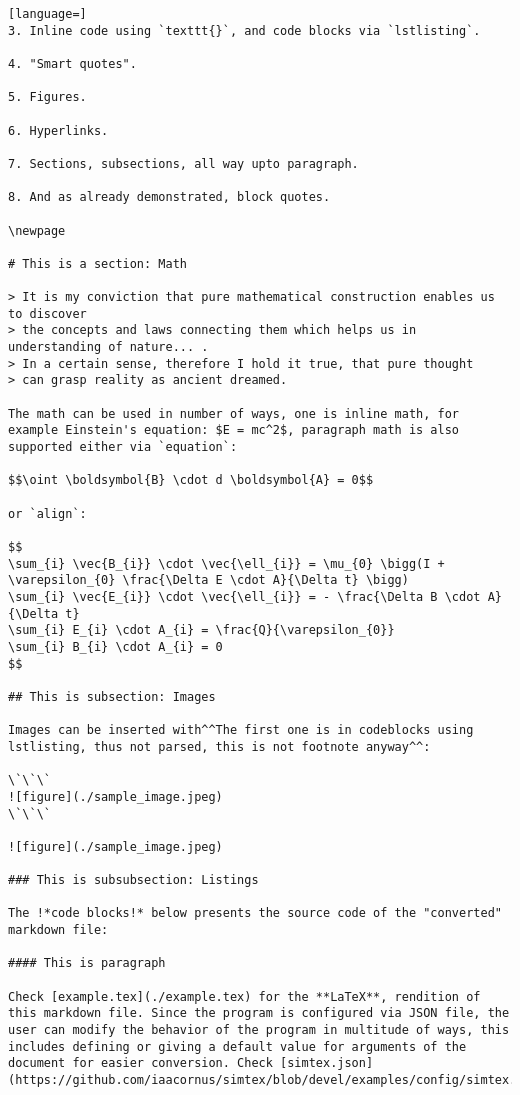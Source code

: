 \documentclass[12pt, UTF8]{article}
\begin{document}
\begin{lstlisting}[language=]
3. Inline code using `texttt{}`, and code blocks via `lstlisting`.

4. "Smart quotes".

5. Figures.

6. Hyperlinks.

7. Sections, subsections, all way upto paragraph.

8. And as already demonstrated, block quotes.

\newpage

# This is a section: Math

> It is my conviction that pure mathematical construction enables us to discover
> the concepts and laws connecting them which helps us in understanding of nature... .
> In a certain sense, therefore I hold it true, that pure thought
> can grasp reality as ancient dreamed.

The math can be used in number of ways, one is inline math, for example Einstein's equation: $E = mc^2$, paragraph math is also supported either via `equation`:

$$\oint \boldsymbol{B} \cdot d \boldsymbol{A} = 0$$

or `align`:

$$
\sum_{i} \vec{B_{i}} \cdot \vec{\ell_{i}} = \mu_{0} \bigg(I + \varepsilon_{0} \frac{\Delta E \cdot A}{\Delta t} \bigg)
\sum_{i} \vec{E_{i}} \cdot \vec{\ell_{i}} = - \frac{\Delta B \cdot A}{\Delta t}
\sum_{i} E_{i} \cdot A_{i} = \frac{Q}{\varepsilon_{0}}
\sum_{i} B_{i} \cdot A_{i} = 0
$$

## This is subsection: Images

Images can be inserted with^^The first one is in codeblocks using lstlisting, thus not parsed, this is not footnote anyway^^:

\`\`\`
![figure](./sample_image.jpeg)
\`\`\`

![figure](./sample_image.jpeg)

### This is subsubsection: Listings

The !*code blocks!* below presents the source code of the "converted" markdown file:

#### This is paragraph

Check [example.tex](./example.tex) for the **LaTeX**, rendition of this markdown file. Since the program is configured via JSON file, the user can modify the behavior of the program in multitude of ways, this includes defining or giving a default value for arguments of the document for easier conversion. Check [simtex.json](https://github.com/iaacornus/simtex/blob/devel/examples/config/simtex.json).

\end{lstlisting}
	
\end{document}
